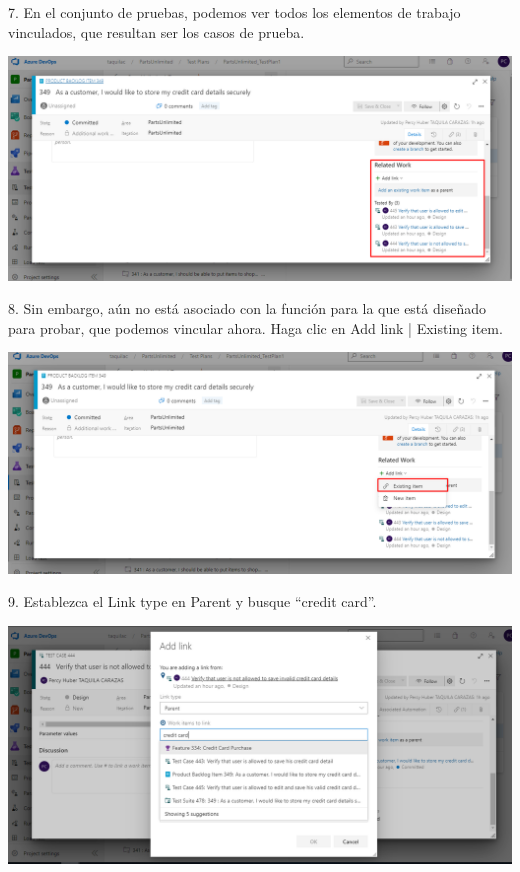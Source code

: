 \documentclass[12pt,letterpaper]{article}
\begin{document}
7. En el conjunto de pruebas, podemos ver todos los elementos de trabajo vinculados, que resultan ser los casos de prueba.

\begin{center}
		\includegraphics[width=15cm]{./Imagenes/6} 
\end{center}

8. Sin embargo, aún no está asociado con la función para la que está diseñado para probar, que podemos vincular ahora. Haga clic en Add link | Existing item.

\begin{center}
		\includegraphics[width=15cm]{./Imagenes/7} 
\end{center}

9. Establezca el Link type en Parent  y busque “credit card”.

\begin{center}
		\includegraphics[width=15cm]{./Imagenes/8} 
\end{center}
\end{document}
